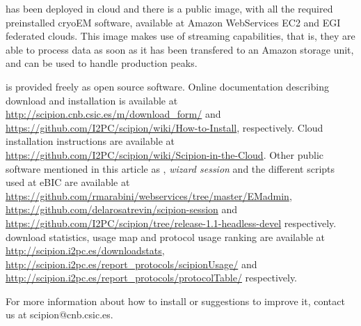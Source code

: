  \scipion has been deployed in cloud and there is a public image, with all the required preinstalled cryoEM software,  available at Amazon WebServices EC2 and EGI federated clouds. This image makes use of \scipion streaming capabilities, that is, they are able to process data as soon as it has been transfered to an Amazon storage unit, and can be used to handle  production peaks.
 
 
\scipion is provided 
freely as open source software. Online documentation
describing \scipion download and installation is available
at \url{http://scipion.cnb.csic.es/m/download_form/} and \url{https://github.com/I2PC/scipion/wiki/How-to-Install}, respectively. Cloud installation instructions are available at \url{https://github.com/I2PC/scipion/wiki/Scipion-in-the-Cloud}. Other public software mentioned in this article as \emadmin, \emph{wizard session} and the different scripts used at eBIC are available at \url{https://github.com/rmarabini/webservices/tree/master/EMadmin}, \url{https://github.com/delarosatrevin/scipion-session} and \url{https://github.com/I2PC/scipion/tree/release-1.1-headless-devel} respectively.
\scipion download statistics, usage map and protocol usage ranking are available at \url{http://scipion.i2pc.es/downloadstats}, \url{http://scipion.i2pc.es/report_protocols/scipionUsage/} and \url{http://scipion.i2pc.es/report_protocols/protocolTable/} respectively.

 For more information about how to install \scipion or
suggestions to improve it, contact us at scipion@cnb.csic.es.






